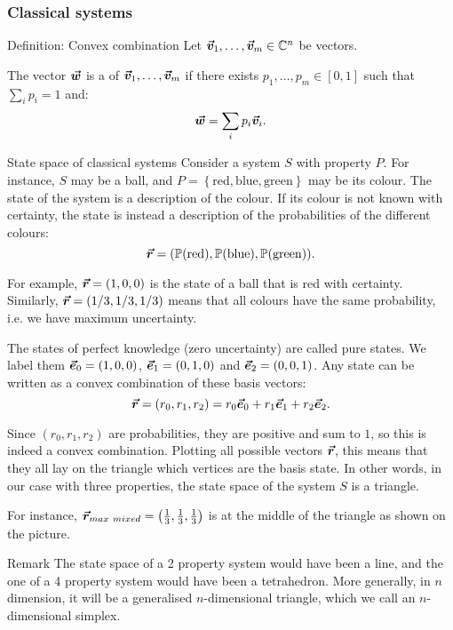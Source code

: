 \documentclass[a4paper]{article}
\begin{document}
\subsubsection{Classical systems}

\begin{parag}{Definition: Convex combination}
    Let $\bm{\protect\vec{v}}_1, \ldots, \bm{\protect\vec{v}}_m \in \mathbb{C}^n$ be vectors.

    The vector $\bm{\protect\vec{w}}$ is a  of $\bm{\protect\vec{v}}_1, \ldots, \bm{\protect\vec{v}}_m$ if there exists $p_1, \ldots, p_m \in \left[0, 1\right]$ such that $\sum_{i} p_i = 1$ and: 
    \[\bm{\protect\vec{w}} = \sum_{i} p_i \bm{\protect\vec{v}}_i.\]
\end{parag}

\begin{parag}{State space of classical systems}
    Consider a system $S$ with property $P$. For instance, $S$ may be a ball, and $P = \left\{\text{red}, \text{blue}, \text{green}\right\}$ may be its colour. The state of the system is a description of the colour. If its colour is not known with certainty, the state is instead a description of the probabilities of the different colours: 
    \[\bvec{r} = \left(\prob\left(\text{red}\right), \prob\left(\text{blue}\right), \prob\left(\text{green}\right)\right).\]
    
    For example, $\bvec{r} = \left(1, 0, 0\right)$ is the state of a ball that is red with certainty. Similarly, $\bvec{r} = \left(1/3, 1/3, 1/3\right)$ means that all colours have the same probability, i.e. we have maximum uncertainty.

    The states of perfect knowledge (zero uncertainty) are called pure states. We label them $\bvec{e}_0 = \left(1, 0, 0\right)$, $\bvec{e}_1 = \left(0, 1, 0\right)$ and $\bvec{e}_2 = \left(0, 0, 1\right)$. Any state can be written as a convex combination of these basis vectors: 
    \[\bvec{r} = \left(r_0, r_1, r_2\right) =  r_0 \bvec{e}_0 + r_1 \bvec{e}_1 + r_2 \bvec{e}_2.\]

    Since $\left(r_0, r_1, r_2\right)$ are probabilities, they are positive and sum to $1$, so this is indeed a convex combination. Plotting all possible vectors $\bm{\protect\vec{r}}$, this means that they all lay on the triangle which vertices are the basis state. In other words, in our case with three properties, the state space of the system $S$ is a triangle.

    For instance, $\bvec{r}_{max\ mixed} = \left(\frac{1}{3}, \frac{1}{3}, \frac{1}{3}\right)$ is at the middle of the triangle as shown on the picture.

    \begin{subparag}{Remark}
        The state space of a 2 property system would have been a line, and the one of a 4 property system would have been a tetrahedron. More generally, in $n$ dimension, it will be a generalised $n$-dimensional triangle, which we call an $n$-dimensional simplex.
    \end{subparag}
\end{parag}
\end{document}
